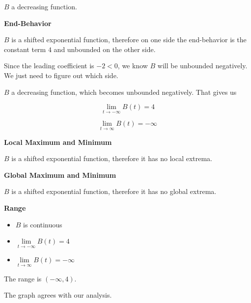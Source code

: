 \documentclass{ximera}
\begin{document}
\begin{example}
$B$ a decreasing function. 







\textbf{End-Behavior}

$B$ is a shifted exponential function, therefore on one side the end-behavior is the constant term $4$ and unbounded on the other side. 


Since the leading coefficient is $-2 < 0$, we know $B$ will be unbounded negatively.  We just need to figure out which side. 



$B$ a decreasing function, which becomes unbounded negatively.  That gives us 


\[ \lim\limits_{t \to -\infty} B(t) = 4 \]

\[ \lim\limits_{t \to \infty} B(t) = -\infty \]





\textbf{Local Maximum and Minimum}

$B$ is a shifted exponential function, therefore it has no local extrema. 





\textbf{Global Maximum and Minimum}

$B$ is a shifted exponential function, therefore it has no global extrema. 





\textbf{Range}

 
\begin{itemize}
\item $B$ is continuous
\item $\lim\limits_{t \to -\infty} B(t) = 4$
\item $\lim\limits_{t \to \infty} B(t) = -\infty$
\end{itemize}


The range is $(-\infty, 4)$. 





The graph agrees with our analysis. 



\end{example}
\end{document}
